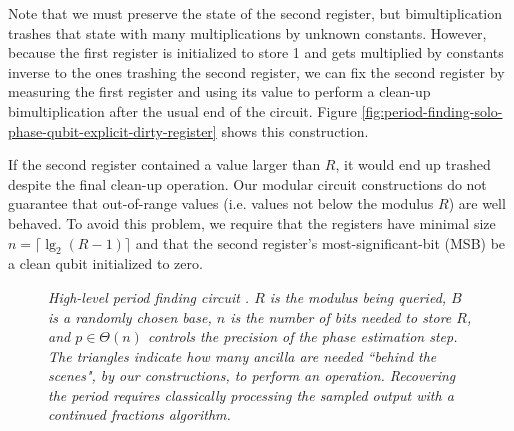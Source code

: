 \documentclass[twocolumn]{article}
\begin{document}
Note that we must preserve the state of the second register, but bimultiplication trashes that state with many multiplications by unknown constants.
However, because the first register is initialized to store 1 and gets multiplied by constants inverse to the ones trashing the second register, we can fix the second register by measuring the first register and using its value to perform a clean-up bimultiplication after the usual end of the circuit.
Figure \ref{fig:period-finding-solo-phase-qubit-explicit-dirty-register} shows this construction.

If the second register contained a value larger than $R$, it would end up trashed despite the final clean-up operation.
Our modular circuit constructions do not guarantee that out-of-range values (i.e. values not below the modulus $R$) are well behaved.
To avoid this problem, we require that the registers have minimal size $n = \lceil \lg_2(R-1) \rceil$ and that the second register's most-significant-bit (MSB) be a clean qubit initialized to zero.

\begin{figure}
  \centering
  \caption{\em
	High-level period finding circuit \cite{Shor1999}.
	$R$ is the modulus being queried, $B$ is a randomly chosen base, $n$ is the number of bits needed to store $R$, and $p \in \Theta(n)$ controls the precision of the phase estimation step.
    The triangles indicate how many ancilla are needed ``behind the scenes", by our constructions, to perform an operation.
	Recovering the period requires classically processing the sampled output with a continued fractions algorithm.
  }
  \label{fig:period-finding}
\end{figure}
\end{document}
